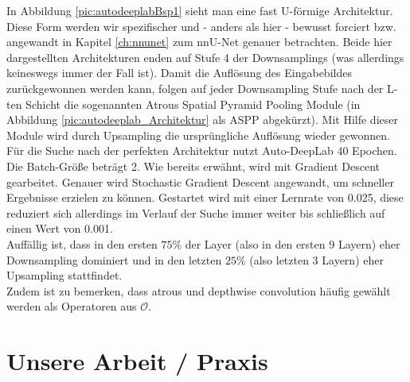 In Abbildung \ref{pic:autodeeplabBsp1} sieht man eine fast U-förmige Architektur. Diese Form werden wir spezifischer und - anders als hier - bewusst forciert bzw. angewandt in Kapitel \ref{ch:nnunet} zum nnU-Net genauer betrachten. Beide hier dargestellten Architekturen enden auf Stufe 4 der Downsamplings (was allerdings keineswegs immer der Fall ist). Damit die Auflösung des Eingabebildes zurückgewonnen werden kann, folgen auf jeder Downsampling Stufe nach der L-ten Schicht die sogenannten Atrous Spatial Pyramid Pooling Module (in Abbildung \ref{pic:autodeeplab_Architektur} als ASPP abgekürzt). Mit Hilfe dieser Module wird durch Upsampling die ursprüngliche Auflösung wieder gewonnen.\\[0.3cm]
Für die Suche nach der perfekten Architektur nutzt Auto-DeepLab 40 Epochen. Die Batch-Größe beträgt 2. Wie bereits erwähnt, wird mit Gradient Descent gearbeitet. Genauer wird Stochastic Gradient Descent angewandt, um schneller Ergebnisse erzielen zu können. Gestartet wird mit einer Lernrate von 0.025, diese reduziert sich allerdings im Verlauf der Suche immer weiter bis schließlich auf einen Wert von 0.001.\\
Auffällig ist, dass in den ersten $75\%$ der Layer (also in den ersten 9 Layern) eher Downsampling dominiert und in den letzten $25\%$ (also letzten 3 Layern) eher Upsampling stattfindet.\\
Zudem ist zu bemerken, dass atrous und depthwise convolution häufig gewählt werden als Operatoren aus $\mathcal{O}$.

\section{Unsere Arbeit / Praxis}

